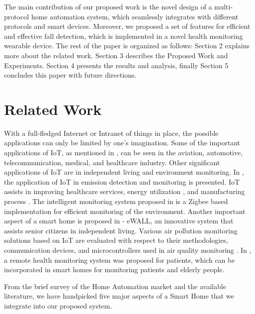 The main contribution of our proposed work is the novel design of a multi-protocol home automation system, which seamlessly integrates with different protocols and smart devices. Moreover, we proposed a set of features for efficient and effective fall detection, which is implemented in a novel health monitoring wearable device. The rest of the paper is organized as follows: Section 2 explains more about the related work. Section 3 describes the Proposed Work and Experiments. Section 4 presents the results and analysis, finally Section 5 concludes this paper with future directions.

\section{Related Work}

With a full-fledged Internet or Intranet of things in place, the possible applications can only be limited by one's imagination. Some of the important applications of IoT, as mentioned in \cite{35}, can be seen in the aviation, automotive, telecommunication, medical, and healthcare industry. Other significant applications of IoT are in independent living and environment monitoring\cite{34}. In \cite{36}, the application of IoT in emission detection and monitoring is presented. IoT assists in improving healthcare services, energy utilization \cite{42}, and manufacturing process \cite{37}. The intelligent monitoring system proposed in \cite{34} is a Zigbee based implementation for efficient monitoring of the environment. Another important aspect of a smart home is proposed in \cite{38} - eWALL, an innovative system that assists senior citizens in independent living. Various air pollution monitoring solutions based on IoT are evaluated with respect to their methodologies, communication devices, and microcontrollers used in air quality monitoring \cite{39}. In \cite{40}, a remote health monitoring system was proposed for patients, which can be incorporated in smart homes for monitoring patients and elderly people. 

From the brief survey of the Home Automation market and the available literature, we have handpicked five major aspects of a Smart Home that we integrate into our proposed system.


